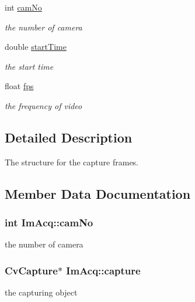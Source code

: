 \begin{DoxyCompactItemize}
int \hyperlink{structImAcq_a9c151285da789cd035360b34d9637831}{cam\-No}
\begin{DoxyCompactList}\small\item\em the number of camera \end{DoxyCompactList}\item 
double \hyperlink{structImAcq_a6a4ccba3d36d599a7902a943f1f6a08c}{start\-Time}
\begin{DoxyCompactList}\small\item\em the start time \end{DoxyCompactList}\item 
float \hyperlink{structImAcq_ac17ac96f1bb1ef278a70eeaec6e0275f}{fps}
\begin{DoxyCompactList}\small\item\em the frequency of video \end{DoxyCompactList}\end{DoxyCompactItemize}


\subsection{Detailed Description}
The structure for the capture frames. 

\subsection{Member Data Documentation}
\hypertarget{structImAcq_a9c151285da789cd035360b34d9637831}{
\subsubsection[{cam\-No}]{\setlength{\rightskip}{0pt plus 5cm}int Im\-Acq\-::cam\-No}}\label{structImAcq_a9c151285da789cd035360b34d9637831}


the number of camera 

\hypertarget{structImAcq_a71a1e8a55bfdf429634751a597a6dcba}{
\subsubsection[{capture}]{\setlength{\rightskip}{0pt plus 5cm}Cv\-Capture$\ast$ Im\-Acq\-::capture}}\label{structImAcq_a71a1e8a55bfdf429634751a597a6dcba}


the capturing object 

